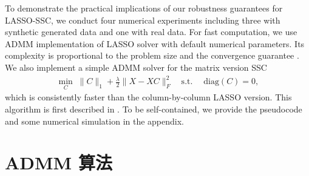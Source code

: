 \documentclass[main.tex]{subfiles}
\begin{document}
\label{chp:experiments}

To demonstrate the practical implications of our robustness guarantees for LASSO-SSC, we conduct four numerical experiments including three with synthetic generated data and one with real data. For fast computation, we use ADMM implementation of LASSO solver
  with default numerical parameters. Its complexity is proportional to the problem size and the convergence guarantee \cite{boyd2011admm}. We also implement a simple ADMM solver for the matrix version SSC
\begin{equation}\label{eq:MatrixLasso}
\begin{aligned}
\min_{C} \; \|C\|_1+\frac{\lambda}{2}\|X-XC\|_F^2 \quad
\text{s.t.} \;\quad\mathrm{diag}(C)=0,
\end{aligned}
\end{equation}
which is consistently faster than the column-by-column LASSO version. This algorithm is first described in \cite{elhamifar2012ssc_journal}. To be self-contained, we   provide the pseudocode and some numerical simulation in the appendix.
\section{ADMM 算法}
\end{document}

